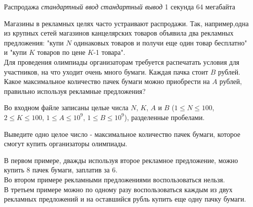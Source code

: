 \begin{problem}%
{Распродажа}%
{\textsl{стандартный ввод}}%
{\textsl{стандартный вывод}}%
{1 секунда}%
{64 мегабайта}{}

Магазины в рекламных целях часто устраивают распродажи. Так, например,одна из крупных сетей магазинов канцелярских товаров объявила два рекламных предложения: "купи $N$ одинаковых товаров и получи еще один товар бесплатно" и "купи $K$ товаров по цене $K$-1 товара".\\

Для проведения олимпиады организаторам требуется распечатать условия для участников, на что уходит очень много бумаги. Каждая пачка стоит $B$ рублей. Какое максимальное количество пачек бумаги можно приобрести на $A$ рублей, правильно используя рекламные предложения?

\InputFile

Во входном файле записаны целые числа $N$, $K$, $A$ и $B$ ($1 \le N \le 100$, $2 \le K \le 100$, $1 \le A \le 10^9$, $1 \le B \le 10^9$), разделенные пробелами.

\OutputFile

Выведите одно целое число - максимальное количество пачек бумаги, которое смогут купить организаторы олимпиады.

\Examples

\begin{example}
%
%
%
\end{example}

\Explanations

В первом примере, дважды используя второе рекламное предложение, можно купить 8 пачек бумаги, заплатив за 6.\\

Во втором примере рекламными предложениями воспользоваться нельзя.\\

В третьем примере можно по одному разу воспользоваться каждым из двух рекламных предложений и на оставшийся рубль купить еще одну пачку бумаги.

\end{problem}